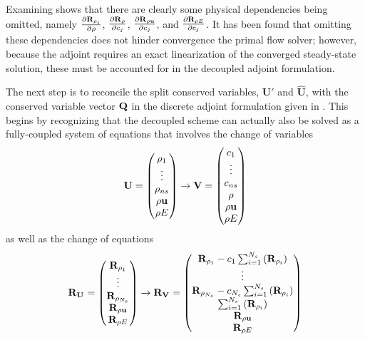 Examining  shows that there are clearly some
physical dependencies being omitted, namely $\frac{\partial \mathbf R_{\rho_i}}{\partial \rho}$,
$\frac{\partial \mathbf R_{\rho}}{\partial c_j}$, $\frac{\partial \mathbf R_{\rho \mathbf u}}{\partial c_j}$, and $\frac{\partial \mathbf R_{\rho E}}{\partial c_j}$.  It has
been found\cite{candler} that omitting these dependencies does not hinder
convergence the primal flow solver; however, because the adjoint requires an
exact linearization of the converged steady-state solution, these must be
accounted for in the decoupled adjoint formulation.

The next step is to reconcile the split conserved variables, $\mathbf{U}'$ and
$\mathbf{\hat{U}}$, with the conserved variable vector $\mathbf Q$ in the discrete
adjoint formulation given in . This begins by recognizing
that the decoupled scheme can actually also be solved as a fully-coupled system
of equations that involves the change of variables
\begin{equation}
  \mathbf U = \begin{pmatrix}
    \rho_1 \\
    \vdots \\
    \rho_{ns} \\
    \rho \mathbf u \\
    \rho E
  \end{pmatrix}
  \rightarrow
  \mathbf V = \begin{pmatrix}
    c_1 \\
    \vdots \\
    c_{ns} \\
    \rho \\
    \rho \mathbf u \\
    \rho E
  \end{pmatrix}
  \label{u-v-vars}
\end{equation}
as well as the change of equations
\begin{equation}
  \mathbf R_{{\mathbf U}_{}} =
  \begin{pmatrix}
    \mathbf R_{\rho_1} \\
    \vdots \\
    \mathbf R_{\rho_{N_s}} \\
    \mathbf R_{\rho \mathbf u} \\
    \mathbf R_{\rho E}
  \end{pmatrix}
  \rightarrow
  \mathbf R_{{\mathbf V}_{}} =
  \begin{pmatrix}
    \mathbf R_{\rho_1} - c_1 \sum_{i=1}^{N_s}\left(\mathbf R_{\rho_i}\right) \\
    \vdots \\
    \mathbf R_{\rho_{N_s}} - c_{N_s} \sum_{i=1}^{N_s}\left(\mathbf R_{\rho_i}\right) \\
    \sum_{i=1}^{N_s}\left(\mathbf R_{\rho_i}\right) \\
    \mathbf R_{\rho \mathbf u} \\
    \mathbf R_{\rho E}
  \end{pmatrix}
  \label{fc-to-dc-res}
\end{equation}
